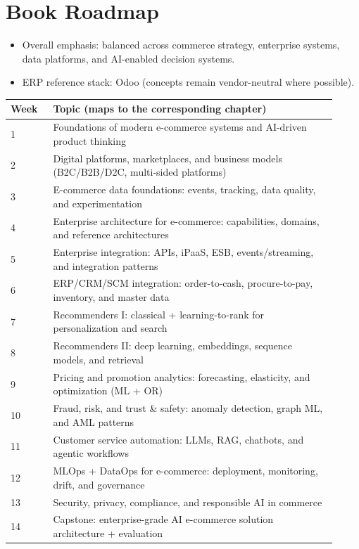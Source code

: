 \documentclass[11pt]{book}
\begin{document}
\section*{Book Roadmap}
\begin{itemize}
  \item Overall emphasis: balanced across commerce strategy, enterprise systems, data platforms, and AI-enabled decision systems.
  \item ERP reference stack: Odoo (concepts remain vendor-neutral where possible).
\end{itemize}
\begin{center}
\begin{tabular}{|p{0.12\linewidth}|p{0.80\linewidth}|}
  \hline
  Week & Topic (maps to the corresponding chapter) \\
  \hline
  1 & Foundations of modern e-commerce systems and AI-driven product thinking \\
  2 & Digital platforms, marketplaces, and business models (B2C/B2B/D2C, multi-sided platforms) \\
  3 & E-commerce data foundations: events, tracking, data quality, and experimentation \\
  4 & Enterprise architecture for e-commerce: capabilities, domains, and reference architectures \\
  5 & Enterprise integration: APIs, iPaaS, ESB, events/streaming, and integration patterns \\
  6 & ERP/CRM/SCM integration: order-to-cash, procure-to-pay, inventory, and master data \\
  7 & Recommenders I: classical + learning-to-rank for personalization and search \\
  8 & Recommenders II: deep learning, embeddings, sequence models, and retrieval \\
  9 & Pricing and promotion analytics: forecasting, elasticity, and optimization (ML + OR) \\
  10 & Fraud, risk, and trust \& safety: anomaly detection, graph ML, and AML patterns \\
  11 & Customer service automation: LLMs, RAG, chatbots, and agentic workflows \\
  12 & MLOps + DataOps for e-commerce: deployment, monitoring, drift, and governance \\
  13 & Security, privacy, compliance, and responsible AI in commerce \\
  14 & Capstone: enterprise-grade AI e-commerce solution architecture + evaluation \\
  \hline
\end{tabular}
\end{center}
\end{document}
